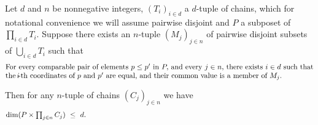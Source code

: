 \documentclass[10pt,a4paper]{amsart}
\begin{document}
\begin{theorem}\label{T.main}
Let $d$ and $n$ be nonnegative integers, $(T_i)_{i\in d}$ a
$\!d\!$-tuple of chains, which for notational convenience we will
assume pairwise disjoint and $P$ a subposet of $\prod_{i\in d} T_i.$
Suppose there exists an $\!n\!$-tuple $(M_j)_{j\in n}$ of
pairwise disjoint subsets of $\bigcup_{i\in d} T_i$ such that
%
\begin{equation}\begin{minipage}[c]{35pc}\label{d.eq_coord}
For every comparable pair of elements $p\leq p'$
in $P,$ and every $j\in n,$ there exists $i\in d$ such
that the $\!i\!$-th coordinates of $p$ and $p'$ are equal,
and their common value is a member of $M_j.$
\end{minipage}\end{equation}

Then for any $\!n\!$-tuple of chains $(C_j)_{j\in n}$ we have
%
\begin{equation}\begin{minipage}[c]{35pc}\label{d.main}
$\dim(P\times\prod_{j\in n} C_j)\ \leq\ d.$
\end{minipage}\end{equation}
%
\end{theorem}
\end{document}
